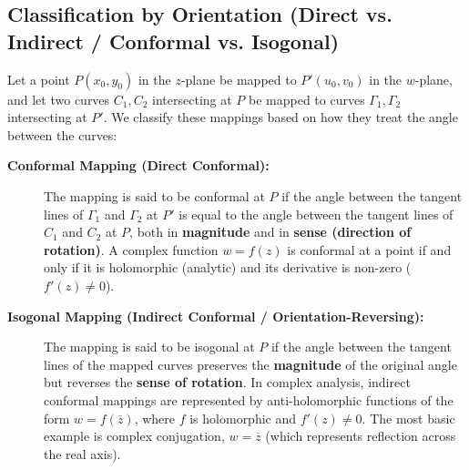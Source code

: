 \documentclass[12pt,a4paper]{article}
\begin{document}
\subsection{Classification by Orientation (Direct vs. Indirect / Conformal vs. Isogonal)}
Let a point $P(x_0, y_0)$ in the $z$-plane be mapped to $P'(u_0, v_0)$ in the $w$-plane, and let two curves $C_1, C_2$ intersecting at $P$ be mapped to curves $\Gamma_1, \Gamma_2$ intersecting at $P'$. We classify these mappings based on how they treat the angle between the curves:
\begin{description}
    \item[\textbf{Conformal Mapping (Direct Conformal):}] The mapping is said to be conformal at $P$ if the angle between the tangent lines of $\Gamma_1$ and $\Gamma_2$ at $P'$ is equal to the angle between the tangent lines of $C_1$ and $C_2$ at $P$, both in \textbf{magnitude} and in \textbf{sense (direction of rotation)}. A complex function $w = f(z)$ is conformal at a point if and only if it is holomorphic (analytic) and its derivative is non-zero ($f'(z) \neq 0$).
    \item[\textbf{Isogonal Mapping (Indirect Conformal / Orientation-Reversing):}] The mapping is said to be isogonal at $P$ if the angle between the tangent lines of the mapped curves preserves the \textbf{magnitude} of the original angle but reverses the \textbf{sense of rotation}. In complex analysis, indirect conformal mappings are represented by anti-holomorphic functions of the form $w = f(\overline{z})$, where $f$ is holomorphic and $f'(z) \neq 0$. The most basic example is complex conjugation, $w = \overline{z}$ (which represents reflection across the real axis).
\end{description}
\end{document}
